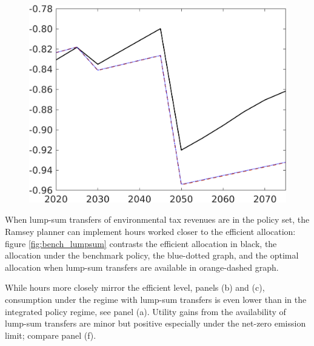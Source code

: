 \begin{figure}[h!!]
\begin{minipage}[]{0.32\textwidth}
	\end{minipage}
	\begin{minipage}[]{0.32\textwidth}
		\includegraphics[width=1\textwidth]{../../codding_model/own_basedOnFried/optimalPol_190722_tidiedUp/figures/all_July22/SWF_CompEffOPT_T_NoTaus_pol4_spillover0_noskill0_sep1_xgrowth0_etaa0.79_lgd0_lff0.png}
	\end{minipage}
\end{figure}

When lump-sum transfers of environmental tax revenues are in the policy set, the Ramsey planner can implement hours worked closer to the efficient allocation: figure \ref{fig:bench_lumpsum} contrasts the efficient allocation in black, the allocation under the benchmark policy, the blue-dotted graph, and the optimal allocation when lump-sum transfers are available in orange-dashed graph. 

While hours more closely mirror the efficient level, panels (b) and (c), consumption under the regime with lump-sum transfers is even lower than in the integrated policy regime, see panel (a). Utility gains from the availability of lump-sum transfers are minor but positive especially under the net-zero emission limit; compare panel (f).


